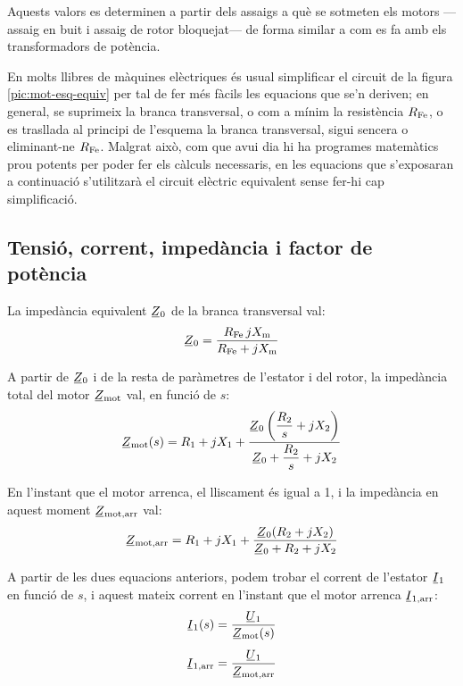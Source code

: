 Aquests valors es determinen a partir dels assaigs a què se sotmeten els motors ---assaig en buit i assaig de rotor bloquejat--- de forma similar a com es fa amb els transformadors de potència.

En molts llibres de màquines elèctriques és usual simplificar el circuit de la figura  \vref{pic:mot-esq-equiv} per tal de fer més fàcils les equacions que se'n deriven; en general, se suprimeix la branca transversal, o com a mínim la resistència $R_\mathrm{Fe}$, o es trasllada al principi de l'esquema la branca transversal, sigui sencera o eliminant-ne  $R_\mathrm{Fe}$. Malgrat això, com que avui dia hi ha programes matemàtics prou potents per poder fer els càlculs necessaris, en les equacions que s'exposaran a continuació s'utilitzarà el circuit elèctric equivalent sense fer-hi cap simplificació.

\subsection{Tensió, corrent, impedància i factor de potència}\label{sec:mot-u-c-i}

La impedància equivalent $\cmplx{Z}_0$ de la branca transversal val:
\begin{equation}\label{eq:mot-Z0}
    \cmplx{Z}_0 = \frac{R\ped{Fe} \, j X\ped{m}}{ R\ped{Fe} + j X\ped{m}}
\end{equation}

A partir de $\cmplx{Z}_0$ i de la resta de paràmetres de l'estator i del rotor, la impedància total del motor $\cmplx{Z}\ped{mot}$ val,  en funció de $s$:
\begin{equation}\label{eq:mot-Zmot}\index{motors d'inducció!impedància}
    \cmplx{Z}\ped{mot}(s) = R_1 + j X_1 + \frac{\cmplx{Z}_0 \left( \dfrac{R_2}{s} + j X_2\right)}{\cmplx{Z}_0 +  \dfrac{R_2}{s} + j X_2}
\end{equation}

En l'instant que el motor arrenca, el lliscament és igual a 1, i la impedància en aquest moment $\cmplx{Z}\ped{mot,arr}$ val:
\begin{equation}\label{eq:z-mot-arr}
    \cmplx{Z}\ped{mot,arr} = R_1 + j X_1 + \frac{\cmplx{Z}_0 ( R_2 + j X_2)}{\cmplx{Z}_0 +  R_2 + j X_2}
\end{equation}

A partir de les dues equacions anteriors, podem trobar el corrent de l'estator  $\cmplx{I}_1$ en funció de $s$, i aquest mateix corrent en l'instant que el motor arrenca $\cmplx{I}\ped{1,arr}$:
\begin{subequations}\index{motors d'inducció!corrent d'arrencada}\index{motors d'inducció!corrent}
\begin{align}
    \cmplx{I}_1(s) &= \frac{\cmplx{U}_1}{\cmplx{Z}\ped{mot}(s)}\label{eq:I1-mot} \\[1ex]
    \cmplx{I}\ped{1,arr} &= \frac{\cmplx{U}_1}{\cmplx{Z}\ped{mot,arr}}\label{eq:I1-mot-arr}
\end{align}
\end{subequations}

